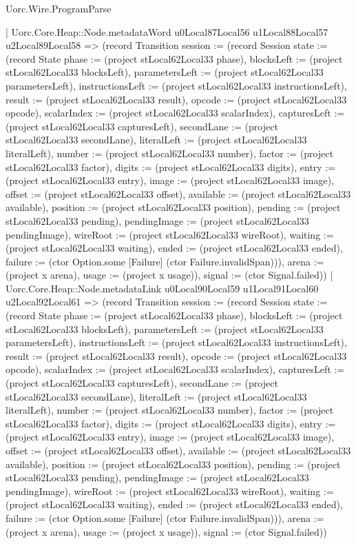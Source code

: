 \begin{lexlean}{Uorc.Wire.ProgramParse}
\begin{semanticmodule}
{        | Uorc.Core.Heap::Node.metadataWord u0Local87Local56 u1Local88Local57 u2Local89Local58 => (record Transition {session := (record Session {state := (record State {phase := (project stLocal62Local33 phase), blocksLeft := (project stLocal62Local33 blocksLeft), parametersLeft := (project stLocal62Local33 parametersLeft), instructionsLeft := (project stLocal62Local33 instructionsLeft), result := (project stLocal62Local33 result), opcode := (project stLocal62Local33 opcode), scalarIndex := (project stLocal62Local33 scalarIndex), capturesLeft := (project stLocal62Local33 capturesLeft), secondLane := (project stLocal62Local33 secondLane), literalLeft := (project stLocal62Local33 literalLeft), number := (project stLocal62Local33 number), factor := (project stLocal62Local33 factor), digits := (project stLocal62Local33 digits), entry := (project stLocal62Local33 entry), image := (project stLocal62Local33 image), offset := (project stLocal62Local33 offset), available := (project stLocal62Local33 available), position := (project stLocal62Local33 position), pending := (project stLocal62Local33 pending), pendingImage := (project stLocal62Local33 pendingImage), wireRoot := (project stLocal62Local33 wireRoot), waiting := (project stLocal62Local33 waiting), ended := (project stLocal62Local33 ended), failure := (ctor Option.some [Failure] (ctor Failure.invalidSpan))}), arena := (project x arena), usage := (project x usage)}), signal := (ctor Signal.failed)})
        | Uorc.Core.Heap::Node.metadataLink u0Local90Local59 u1Local91Local60 u2Local92Local61 => (record Transition {session := (record Session {state := (record State {phase := (project stLocal62Local33 phase), blocksLeft := (project stLocal62Local33 blocksLeft), parametersLeft := (project stLocal62Local33 parametersLeft), instructionsLeft := (project stLocal62Local33 instructionsLeft), result := (project stLocal62Local33 result), opcode := (project stLocal62Local33 opcode), scalarIndex := (project stLocal62Local33 scalarIndex), capturesLeft := (project stLocal62Local33 capturesLeft), secondLane := (project stLocal62Local33 secondLane), literalLeft := (project stLocal62Local33 literalLeft), number := (project stLocal62Local33 number), factor := (project stLocal62Local33 factor), digits := (project stLocal62Local33 digits), entry := (project stLocal62Local33 entry), image := (project stLocal62Local33 image), offset := (project stLocal62Local33 offset), available := (project stLocal62Local33 available), position := (project stLocal62Local33 position), pending := (project stLocal62Local33 pending), pendingImage := (project stLocal62Local33 pendingImage), wireRoot := (project stLocal62Local33 wireRoot), waiting := (project stLocal62Local33 waiting), ended := (project stLocal62Local33 ended), failure := (ctor Option.some [Failure] (ctor Failure.invalidSpan))}), arena := (project x arena), usage := (project x usage)}), signal := (ctor Signal.failed)})
}
\end{semanticmodule}
\end{lexlean}
